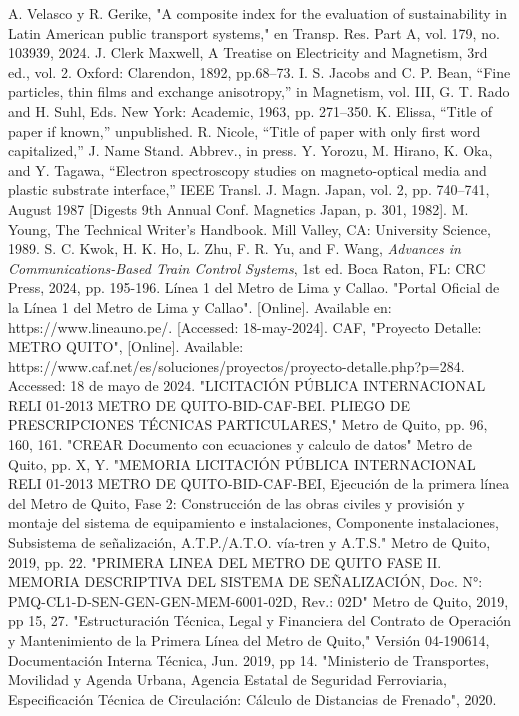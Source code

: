 \documentclass[conference]{IEEEtran}
\begin{document}

\begin{thebibliography}{00}
 A. Velasco y R. Gerike, "A composite index for the evaluation of sustainability in Latin American public transport systems," en Transp. Res. Part A, vol. 179, no. 103939, 2024. 
 J. Clerk Maxwell, A Treatise on Electricity and Magnetism, 3rd ed., vol. 2. Oxford: Clarendon, 1892, pp.68--73.
 I. S. Jacobs and C. P. Bean, ``Fine particles, thin films and exchange anisotropy,'' in Magnetism, vol. III, G. T. Rado and H. Suhl, Eds. New York: Academic, 1963, pp. 271--350.
 K. Elissa, ``Title of paper if known,'' unpublished.
 R. Nicole, ``Title of paper with only first word capitalized,'' J. Name Stand. Abbrev., in press.
 Y. Yorozu, M. Hirano, K. Oka, and Y. Tagawa, ``Electron spectroscopy studies on magneto-optical media and plastic substrate interface,'' IEEE Transl. J. Magn. Japan, vol. 2, pp. 740--741, August 1987 [Digests 9th Annual Conf. Magnetics Japan, p. 301, 1982].
 M. Young, The Technical Writer's Handbook. Mill Valley, CA: University Science, 1989.
 S. C. Kwok, H. K. Ho, L. Zhu, F. R. Yu, and F. Wang, \textit{Advances in Communications-Based Train Control Systems}, 1st ed. Boca Raton, FL: CRC Press, 2024, pp. 195-196.
 Línea 1 del Metro de Lima y Callao. "Portal Oficial de la Línea 1 del Metro de Lima y Callao". [Online]. Available en: https://www.lineauno.pe/. [Accessed: 18-may-2024].
 CAF, "Proyecto Detalle: METRO QUITO", [Online]. Available: https://www.caf.net/es/soluciones/proyectos/proyecto-detalle.php?p=284. Accessed: 18 de mayo de 2024.
 "LICITACIÓN PÚBLICA INTERNACIONAL RELI 01-2013 METRO DE QUITO-BID-CAF-BEI. PLIEGO DE PRESCRIPCIONES TÉCNICAS PARTICULARES," Metro de Quito, pp. 96, 160, 161.
 "CREAR Documento con ecuaciones y calculo de datos" Metro de Quito, pp. X, Y.
 "MEMORIA LICITACIÓN PÚBLICA INTERNACIONAL RELI 01-2013 METRO DE QUITO-BID-CAF-BEI, Ejecución de la primera línea del Metro de Quito, Fase 2: Construcción de las obras civiles y provisión y montaje del sistema de equipamiento e instalaciones, Componente instalaciones, Subsistema de señalización, A.T.P./A.T.O. vía-tren y A.T.S." Metro de Quito, 2019, pp. 22.
 "PRIMERA LINEA DEL METRO DE QUITO FASE II. MEMORIA DESCRIPTIVA DEL SISTEMA DE SEÑALIZACIÓN, Doc. N°: PMQ-CL1-D-SEN-GEN-GEN-MEM-6001-02D, Rev.: 02D" Metro de Quito, 2019, pp 15, 27.
 "Estructuración Técnica, Legal y Financiera del Contrato de Operación y Mantenimiento de la Primera Línea del Metro de Quito," Versión 04-190614, Documentación Interna Técnica, Jun. 2019, pp 14.
 "Ministerio de Transportes, Movilidad y Agenda Urbana, Agencia Estatal de Seguridad Ferroviaria, Especificación Técnica de Circulación: Cálculo de Distancias de Frenado", 2020.


\end{thebibliography}
\end{document}
